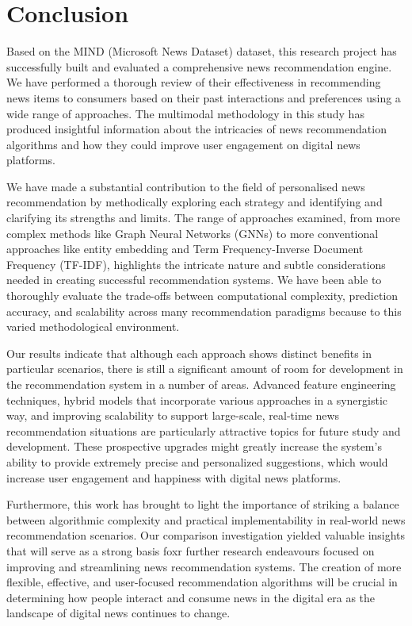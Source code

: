 \documentclass[9pt,twocolumn,twoside,lineno]{gsajnl}
\begin{document}
\section{Conclusion}
Based on the MIND (Microsoft News Dataset) dataset, this research project has successfully built and evaluated a comprehensive news recommendation engine. We have performed a thorough review of their effectiveness in recommending news items to consumers based on their past interactions and preferences using a wide range of approaches. The multimodal methodology in this study has produced insightful information about the intricacies of news recommendation algorithms and how they could improve user engagement on digital news platforms.

We have made a substantial contribution to the field of personalised news recommendation by methodically exploring each strategy and identifying and clarifying its strengths and limits. The range of approaches examined, from more complex methods like Graph Neural Networks (GNNs) to more conventional approaches like entity embedding and Term Frequency-Inverse Document Frequency (TF-IDF), highlights the intricate nature and subtle considerations needed in creating successful recommendation systems. We have been able to thoroughly evaluate the trade-offs between computational complexity, prediction accuracy, and scalability across many recommendation paradigms because to this varied methodological environment.

Our results indicate that although each approach shows distinct benefits in particular scenarios, there is still a significant amount of room for development in the recommendation system in a number of areas. Advanced feature engineering techniques, hybrid models that incorporate various approaches in a synergistic way, and improving scalability to support large-scale, real-time news recommendation situations are particularly attractive topics for future study and development. These prospective upgrades might greatly increase the system's ability to provide extremely precise and personalized suggestions, which would increase user engagement and happiness with digital news platforms.

Furthermore, this work has brought to light the importance of striking a balance between algorithmic complexity and practical implementability in real-world news recommendation scenarios. Our comparison investigation yielded valuable insights that will serve as a strong basis foxr further research endeavours focused on improving and streamlining news recommendation systems. The creation of more flexible, effective, and user-focused recommendation algorithms will be crucial in determining how people interact and consume news in the digital era as the landscape of digital news continues to change.
\end{document}
